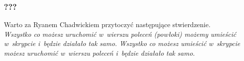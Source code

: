 \documentclass[10pt,t]{beamer}
\begin{document}














\begin{frame}
  \frametitle{???}


  Warto za Ryanem Chadwickiem przytoczyć następujące stwierdzenie. \\
  \textit{Wszystko co możesz uruchomić w~wierszu poleceń (powłoki) możemy
    umieścić w~skrypcie i~będzie działało tak samo. Wszystko co możesz
    umieścić w~skrypcie możesz uruchomić w~wierszu poleceń i~będzie
    działało tak samo.}
  \parencite{Chadwick-BASH-Scripting-Tutorial-Part-I-What-is-ETC-Ver-2025}

\end{frame}
\end{document}
